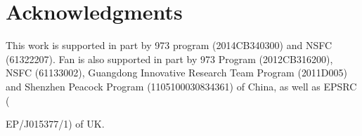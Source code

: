 \documentclass[10pt,journal,compsoc,twoside]{IEEEtran}
\newcounter{definition}[section]
\begin{document}
\section*{Acknowledgments}
This work is supported in part by  973 program ({\small 2014CB340300}) and NSFC ({\small 61322207}).
Fan is also supported in part by 973
Program ({\small 2012CB316200}), NSFC ({\small 61133002}),
Guangdong Innovative Research Team Program
({\small 2011D005}) and Shenzhen Peacock Program
({\small 1105100030834361}) of China,
as well as EPSRC ({\small  EP/J015377/1) of UK.




%
%
%
\vspace{-2ex}
\renewcommand{\baselinestretch}{0.92}
\setlength{\baselineskip}{6pt}
\begin{footnotesize}


\end{footnotesize}

\appendices


%

}
\end{document}
